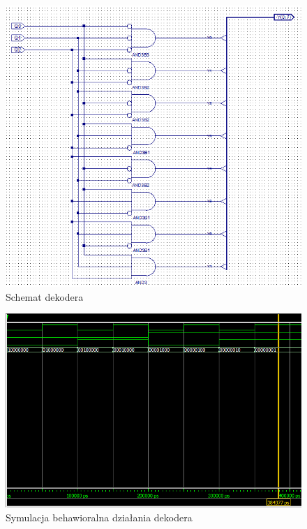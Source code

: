 \documentclass[wide,a4paper,titlepage,12pt] {article}
\begin{document}
  \begin{figure}[htbp]
    \begin{center}
      \includegraphics[scale=0.6]{dekoder.png}
      \caption{Schemat dekodera}
    \end{center}
  \end{figure}

  \begin{figure}[htbp]
    \begin{center}
      \includegraphics[scale=0.4]{dekoder_beh.png}
      \caption{Symulacja behawioralna działania dekodera}
    \end{center}
  \end{figure}
\end{document}
